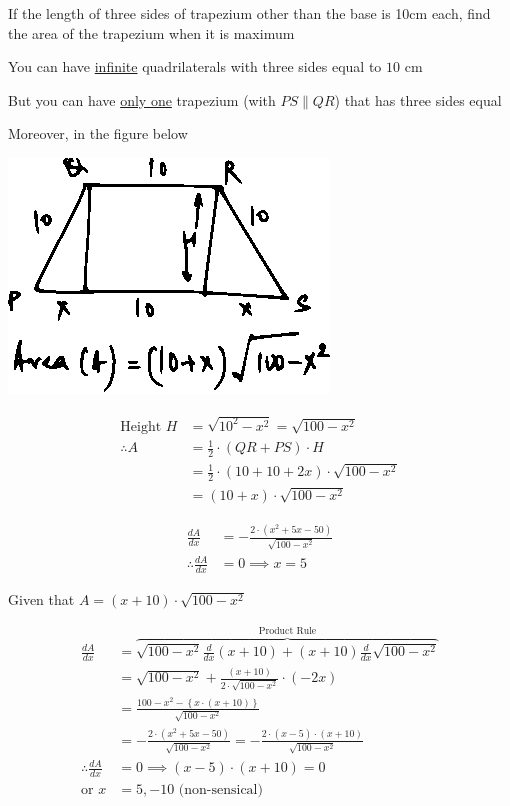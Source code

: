 \documentclass[14pt,fleqn]{extarticle}
\begin{document}
\newcommand\ea{100-x^2}
\newcommand\es{\sqrt{\ea}}
\newcommand\eb{\left(x+10 \right)}

If the length of three sides of trapezium 
other than the base is 10cm each, find the 
area of the trapezium when it is maximum
%

\newcard

You can have \underline{infinite} quadrilaterals with
three sides equal to $10$ cm\newline 

But you can have
\underline{only one} trapezium (with $PS\parallel QR$) that has 
three sides equal \newline 

Moreover, in the figure below 
\begin{center} 
\includegraphics[scale=1.5]{figure.eps} 
\end{center} 
\begin{align}
\text{Height } H &= \sqrt{10^2 - x^2} = \sqrt{100-x^2} \\
\therefore A &= \frac{1}{2}\cdot \left(QR + PS \right)\cdot H \\
&= \frac{1}{2}\cdot \left(10 + 10 +2x \right)\cdot \sqrt{100-x^2} \\
&= \left(10+x \right)\cdot \sqrt{100-x^2} 
\end{align}

\newcard

\begin{align}
	\frac{dA}{dx} &= - \frac{2\cdot \left(x^2 + 5x-50 \right)}{\es} \\
	\therefore \frac{dA}{dx} &=0 \implies x = 5 
\end{align}

\newcard 

Given that $A = \eb\cdot\es$

\begin{align}
\frac{dA}{dx} &= \overbrace{\es \frac{d}{dx}\eb + \eb \frac{d}{dx}\es}^{\text{Product Rule}} \\
&= \es + \frac{\eb}{2\cdot \es}\cdot \left(-2x \right) \\
&= \frac{\ea - \left\lbrace x\cdot \eb\right\rbrace}{\es} \\
&= -\frac{2\cdot \left(x^2+5x-50 \right)}{\es} = - \frac{2\cdot (x-5)\cdot (x+10)}{\es} \\
\therefore \frac{dA}{dx} &= 0 \implies (x-5)\cdot (x+10) = 0 \\
\text{or } x &= 5, -10\text{ (non-sensical)}
\end{align} 
\end{document}

